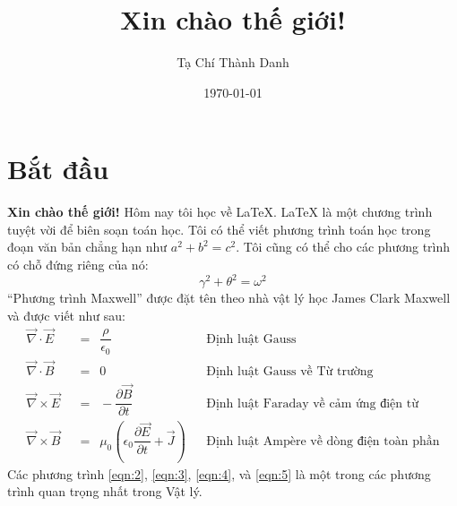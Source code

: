 \documentclass[a4paper,notitlepage]{article}
\title{Xin chào thế giới!}
\author{Tạ Chí Thành Danh}
\date{\today}
\begin{document}
	\maketitle
	\section{Bắt đầu}
	\textbf{Xin chào thế giới!} Hôm nay tôi học về \LaTeX. \LaTeX{} là một chương trình tuyệt vời để biên soạn toán học. Tôi có thể viết phương trình toán học trong đoạn văn bản chẳng hạn như $a^2 + b^2 = c^2$. Tôi cũng có thể cho các phương trình có chỗ đứng riêng của nó:
	\begin{equation}
		\gamma^2 + \theta^2 = \omega^2
	\end{equation}
	``Phương trình Maxwell'' được đặt tên theo nhà vật lý học James Clark Maxwell và được viết như sau:
	\begin{align} 
		\vec\nabla \cdot \vec E \enspace &= \enspace \dfrac{\rho}{\epsilon_0} && \text{Định luật Gauss} \label{eqn:2} \\
		\vec\nabla \cdot \vec B \enspace &= \enspace 0 && \text{Định luật Gauss về Từ trường} \label{eqn:3} \\
		\vec\nabla \times \vec E \enspace &= \enspace -\dfrac{\partial \vec B}{\partial t} && \text{Định luật Faraday về cảm ứng điện từ} \label{eqn:4} \\
		\vec\nabla \times \vec B \enspace &= \enspace \mu_0 \left(\epsilon_0 \dfrac{\partial \vec E}{\partial t} + \vec J\right) && \text{Định luật Ampère về dòng điện toàn phần} \label{eqn:5}
	\end{align}
	Các phương trình \ref{eqn:2}, \ref{eqn:3}, \ref{eqn:4}, và \ref{eqn:5} là một trong các phương trình quan trọng nhất trong Vật lý.
\end{document}
